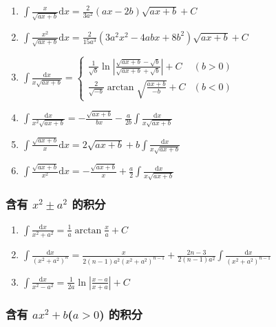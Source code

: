 \begin{small}
\begin{enumerate}
\item $ \int \frac{x}{\sqrt{ax+b}} \mathrm{d}x = \frac{2}{3a^2} (ax-2b) \sqrt{ax+b} + C $

\item $ \int \frac{x^2}{\sqrt{ax+b}} \mathrm{d} x = \frac{2}{15a^3} (3a^2x^2 - 4abx + 8b^2) \sqrt{ax+b} + C $

\item $ \int \frac{\mathrm{d} x}{x\sqrt{ax+b}} = \begin{cases}
\frac{1}{\sqrt{b}}\ln\left| \frac{\sqrt{ax+b} - \sqrt{b}}{\sqrt{ax+b} + \sqrt{b}} \right| + C & (b>0) \\
\frac{2}{\sqrt{-b}}\arctan\sqrt{\frac{ax+b}{-b}} + C & (b<0)
\end{cases} $

\item $ \int \frac{\mathrm{d} x}{x^2\sqrt{ax+b}} = -\frac{\sqrt{ax+b}}{bx} - \frac{a}{2b} \int \frac{\mathrm{d} x}{x\sqrt{ax+b}} $

\item $ \int \frac{\sqrt{ax+b}}{x}\mathrm{d} x = 2\sqrt{ax+b} + b\int\frac{\mathrm{d} x}{x\sqrt{ax+b}} $

\item $ \int \frac{\sqrt{ax+b}}{x^2}\mathrm{d}x = -\frac{\sqrt{ax+b}}{x} + \frac{a}{2} \int \frac{\mathrm{d}x}{x\sqrt{ax+b}} $

\end{enumerate}

\subsubsection{含有 $x^2 \pm a^2$ 的积分}

\begin{enumerate}

\item $ \int \frac{\mathrm{d}x}{x^2 + a^2} = \frac{1}{a} \arctan\frac{x}{a} + C$

\item $ \int \frac{\mathrm{d}x}{(x^2+a^2)^n} = \frac{x}{2(n-1)a^2(x^2+a^2)^{n-1}}+\frac{2n-3}{2(n-1)a^2} \int \frac{\mathrm{d}x}{(x^2+a^2)^{n-1}} $

\item $\int \frac{\mathrm{d}x}{x^2-a^2} = \frac{1}{2a}\ln\left| \frac{x-a}{x+a} \right| + C $


\end{enumerate}

\subsubsection{含有 $ax^2+b$($a>0$) 的积分}


\end{small}
